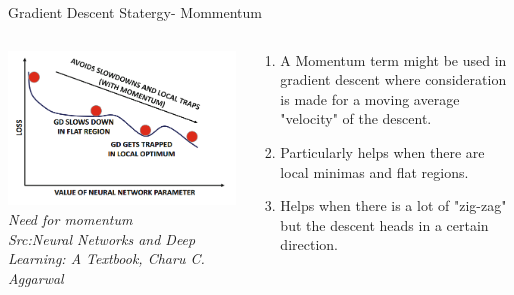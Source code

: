   \begin{frame}{Gradient Descent Statergy- Mommentum}
    \begin{columns}[T]
    \begin{column}{0.4\textwidth}
      \includegraphics[width=\textwidth]{images/momentum.png}
      \tiny{\textit{Need for momentum\\ Src:Neural Networks and Deep Learning: A Textbook, Charu C. Aggarwal}}
    \end{column}
    \begin{column}{0.6\textwidth}
    \begin{enumerate}[$\bullet$]
    \item A Momentum term might be used in gradient descent where consideration is made for a moving average "velocity" of the descent.\pause
    \item Particularly helps when there are local minimas and flat regions. \pause
    \item  Helps when there is a lot of "zig-zag" but the descent heads in a certain direction.
    \end{enumerate}
    \end{column}
    \end{columns}
\end{frame}


